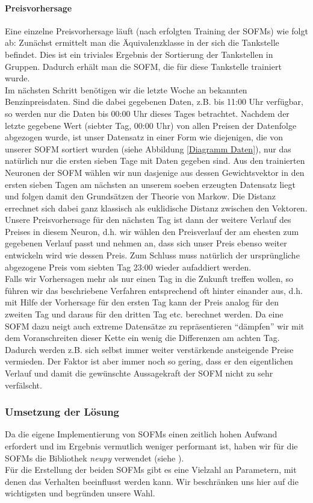 \documentclass[11pt]{article}
\begin{document}
	\paragraph{Preisvorhersage\\}
	Eine einzelne Preisvorhersage läuft (nach erfolgten Training der SOFMs) wie folgt ab: Zunächst ermittelt man die Äquivalenzklasse in der sich die Tankstelle befindet. Dies ist ein triviales Ergebnis der Sortierung der Tankstellen in Gruppen. Dadurch erhält man die SOFM, die für diese Tankstelle trainiert wurde.\\
	Im nächsten Schritt benötigen wir die letzte Woche an bekannten Benzinpreisdaten. Sind die dabei gegebenen Daten, z.B. bis 11:00 Uhr verfügbar, so werden nur die Daten bis 00:00 Uhr dieses Tages betrachtet. Nachdem der letzte gegebene Wert (siebter Tag, 00:00 Uhr) von allen Preisen der Datenfolge abgezogen wurde, ist unser Datensatz in einer Form wie diejenigen, die von unserer SOFM sortiert wurden (siehe Abbildung \ref{Diagramm Daten}), nur das natürlich nur die ersten sieben Tage mit Daten gegeben sind. Aus den trainierten Neuronen der SOFM wählen wir nun dasjenige aus dessen Gewichtsvektor in den ersten sieben Tagen am nächsten an unserem soeben erzeugten Datensatz liegt und folgen damit den Grundsätzen der Theorie von Markow. Die Distanz errechnet sich dabei ganz klassisch als euklidische Distanz zwischen den Vektoren. Unsere Preisvorhersage für den nächsten Tag ist dann der weitere Verlauf des Preises in diesem Neuron, d.h. wir wählen den Preisverlauf der am ehesten zum gegebenen Verlauf passt und nehmen an, dass sich unser Preis ebenso weiter entwickeln wird wie dessen Preis. Zum Schluss muss natürlich der ursprüngliche abgezogene Preis vom siebten Tag 23:00 wieder aufaddiert werden.\\
	Falls wir Vorhersagen mehr als nur einen Tag in die Zukunft treffen wollen, so führen wir das beschriebene Verfahren entsprechend oft hinter einander aus, d.h. mit Hilfe der Vorhersage für den ersten Tag kann der Preis analog für den zweiten Tag und daraus für den dritten Tag etc. berechnet werden. Da eine SOFM dazu neigt auch extreme Datensätze zu repräsentieren "`dämpfen"' wir mit dem Voranschreiten dieser Kette ein wenig die Differenzen am achten Tag. Dadurch werden z.B. sich selbst immer weiter verstärkende ansteigende Preise vermieden. Der Faktor ist aber immer noch so gering, dass er den eigentlichen Verlauf und damit die gewünschte Aussagekraft der SOFM nicht zu sehr verfälscht.

\subsubsection{Umsetzung der Lösung}
	Da die eigene Implementierung von SOFMs einen zeitlich hohen Aufwand erfordert und im Ergebnis vermutlich weniger performant ist, haben wir für die SOFMs die Bibliothek \textit{neupy} verwendet (siehe \cite{neupy}).\\
	Für die Erstellung der beiden SOFMs gibt es eine Vielzahl an Parametern, mit denen das Verhalten beeinflusst werden kann. Wir beschränken uns hier auf die wichtigsten und begründen unsere Wahl.
\end{document}
